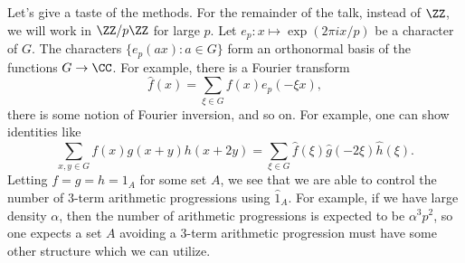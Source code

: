 \documentclass{article}
\begin{document}
Let's give a taste of the methods. For the remainder of the talk, instead of $\ZZ$, we will work in $\ZZ/p\ZZ$ for large $p$. Let $e_p\colon x\mapsto\exp(2\pi ix/p)$ be a character of $G$. The characters $\{e_p(ax):a\in G\}$ form an orthonormal basis of the functions $G\to\CC$. For example, there is a Fourier transform
\[\widehat f(x)=\sum_{\xi\in G}f(x)e_p(-\xi x),\]
there is some notion of Fourier inversion, and so on. For example, one can show identities like
\[\sum_{x,y\in G}f(x)g(x+y)h(x+2y)=\sum_{\xi\in G}\widehat f(\xi)\widehat g(-2\xi)\widehat h(\xi).\]
Letting $f=g=h=1_A$ for some set $A$, we see that we are able to control the number of $3$-term arithmetic progressions using $\widehat 1_A$. For example, if we have large density $\alpha$, then the number of arithmetic progressions is expected to be $\alpha^3p^2$, so one expects a set $A$ avoiding a $3$-term arithmetic progression must have some other structure which we can utilize.
\end{document}
